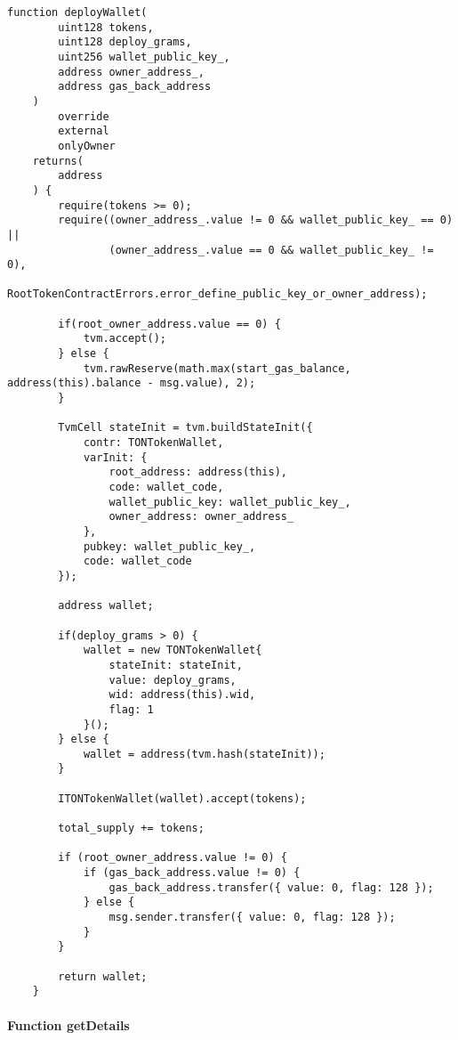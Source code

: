 \vspace{2cm}

\begin{lstlisting}[firstnumber=164]
    function deployWallet(
        uint128 tokens,
        uint128 deploy_grams,
        uint256 wallet_public_key_,
        address owner_address_,
        address gas_back_address
    )
        override
        external
        onlyOwner
    returns(
        address
    ) {
        require(tokens >= 0);
        require((owner_address_.value != 0 && wallet_public_key_ == 0) ||
                (owner_address_.value == 0 && wallet_public_key_ != 0),
                RootTokenContractErrors.error_define_public_key_or_owner_address);

        if(root_owner_address.value == 0) {
            tvm.accept();
        } else {
            tvm.rawReserve(math.max(start_gas_balance, address(this).balance - msg.value), 2);
        }

        TvmCell stateInit = tvm.buildStateInit({
            contr: TONTokenWallet,
            varInit: {
                root_address: address(this),
                code: wallet_code,
                wallet_public_key: wallet_public_key_,
                owner_address: owner_address_
            },
            pubkey: wallet_public_key_,
            code: wallet_code
        });

        address wallet;

        if(deploy_grams > 0) {
            wallet = new TONTokenWallet{
                stateInit: stateInit,
                value: deploy_grams,
                wid: address(this).wid,
                flag: 1
            }();
        } else {
            wallet = address(tvm.hash(stateInit));
        }

        ITONTokenWallet(wallet).accept(tokens);

        total_supply += tokens;

        if (root_owner_address.value != 0) {
            if (gas_back_address.value != 0) {
                gas_back_address.transfer({ value: 0, flag: 128 });
            } else {
                msg.sender.transfer({ value: 0, flag: 128 });
            }
        }

        return wallet;
    }
\end{lstlisting}

\paragraph{Function getDetails}


